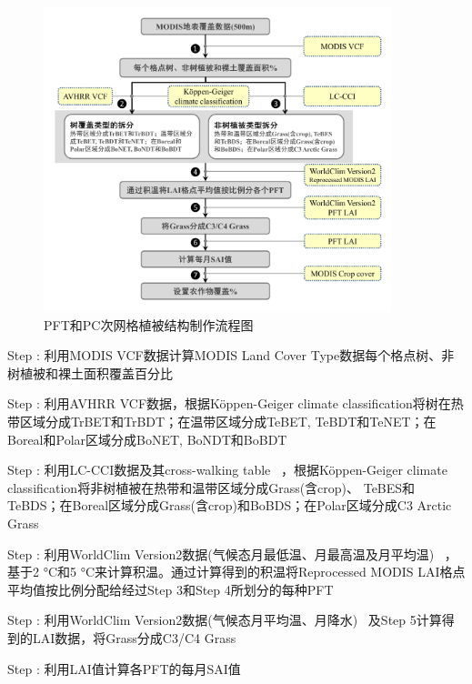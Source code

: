 {
\begin{figure}[htbp]
\centering
\includegraphics[width=0.9\textwidth]{Figures/尺度转换/PFT和PC植被结构制作流程图.png}
\caption{PFT和PC次网格植被结构制作流程图}
\label{fig:植被结构制作流程图}
\end{figure}
}

 Step : 利用MODIS VCF数据计算MODIS Land Cover Type数据每个格点树、非树植被和裸土面积覆盖百分比

Step : 利用AVHRR VCF数据，根据Köppen-Geiger climate classification将树在热带区域分成TrBET和TrBDT；在温带区域分成TeBET, TeBDT和TeNET；在Boreal和Polar区域分成BoNET, BoNDT和BoBDT

Step : 利用LC-CCI数据及其cross-walking table ~\citep{poulter2015PlantFunctionalType}，根据Köppen-Geiger climate classification将非树植被在热带和温带区域分成Grass(含crop)、 TeBES和TeBDS；在Boreal区域分成Grass(含crop)和BoBDS；在Polar区域分成C3 Arctic Grass

Step : 利用WorldClim Version2数据(气候态月最低温、月最高温及月平均温) ~\citep{fick2017worldclim}，基于2 °C和5 °C来计算积温。通过计算得到的积温将Reprocessed MODIS LAI格点平均值按比例分配给经过Step 3和Step 4所划分的每种PFT

Step : 利用WorldClim Version2数据(气候态月平均温、月降水) ~\citep{fick2017worldclim}及Step 5计算得到的LAI数据，将Grass分成C3/C4 Grass ~\citep{still2003GlobalDistributionC3}

Step : 利用LAI值计算各PFT的每月SAI值 \citep{lawrence2007representing,zeng2002coupling}

